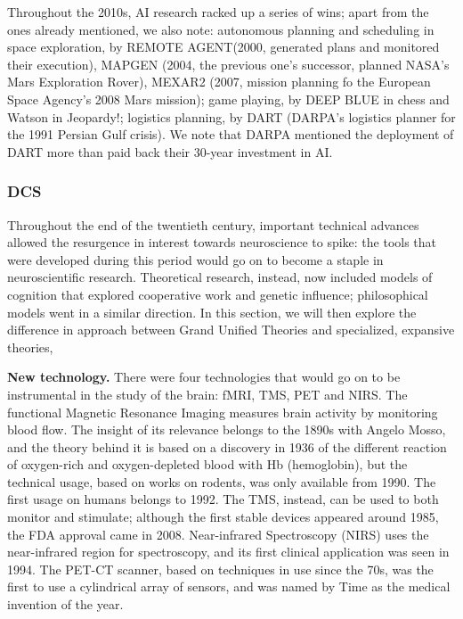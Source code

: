 \documentclass[../main.tex]{subfiles}
\begin{document}
\vspace{4pt}
Throughout the 2010s, AI research racked up a series of wins; apart from the ones already mentioned, we also note: autonomous planning and scheduling in space exploration, by REMOTE AGENT(2000, generated plans and monitored their execution), MAPGEN (2004, the previous one's successor, planned NASA's Mars Exploration Rover), MEXAR2 (2007, mission planning fo the European Space Agency's 2008 Mars mission); game playing, by DEEP BLUE in chess and Watson in Jeopardy!; logistics planning, by DART (DARPA's logistics planner for the 1991 Persian Gulf crisis). We note that DARPA mentioned the deployment of DART more than paid back their 30-year investment in AI.

\subsubsection{DCS}
Throughout the end of the twentieth century, important technical advances allowed the resurgence in interest towards neuroscience to spike: the tools that were developed during this period would go on to become a staple in neuroscientific research. Theoretical research, instead, now included models of cognition that explored cooperative work and genetic influence; philosophical models went in a similar direction. In this section, we will then explore the difference in approach between Grand Unified Theories and specialized, expansive theories,

\vspace{4pt}
\textbf{New technology.} There were four technologies that would go on to be instrumental in the study of the brain: fMRI, TMS, PET and NIRS. The functional Magnetic Resonance Imaging measures brain activity by monitoring blood flow. The insight of its relevance belongs to the 1890s with Angelo Mosso, and the theory behind it is based on a discovery in 1936 of the different reaction of oxygen-rich and oxygen-depleted blood with Hb (hemoglobin), but the technical usage, based on works on rodents\cite{thulbornRoleFerritinHemosiderin1990}\cite{ogawaBrainMagneticResonance1990}, was only available from 1990. The first usage on humans belongs to 1992\cite{kwongDynamicMagneticResonance1992}. The TMS, instead, can be used to both monitor and stimulate; although the first stable devices appeared around 1985, the FDA approval came in 2008\cite{horvathTranscranialMagneticStimulation2011}. Near-infrared Spectroscopy (NIRS) uses the near-infrared region for spectroscopy, and its first clinical application was seen in 1994\cite{ferrariBriefReviewHistory2012}. The PET-CT scanner, based on techniques in use since the 70s, was the first to use a cylindrical array of sensors, and was named by Time as the medical invention of the year.
\end{document}
